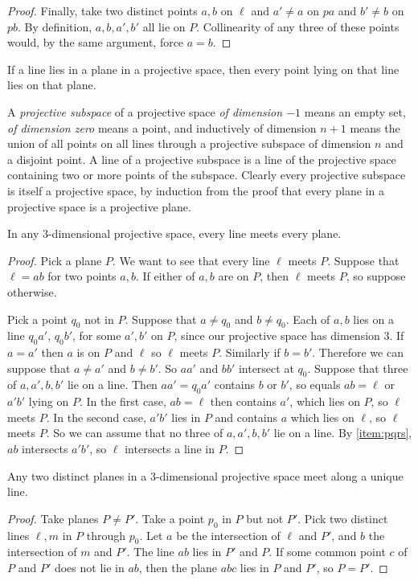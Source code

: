 \begin{proof}
Finally, take two distinct points \(a,b\) on \(\ell\) and \(a' \ne a\) on \(pa\) and \(b' \ne b\) on \(pb\).
By definition, \(a, b, a', b'\) all lie on \(P\).
Collinearity of any three of these points would, by the same argument, force \(a=b\).
\end{proof}
\begin{corollary}
If a line lies in a plane in a projective space, then every point lying on that line lies on that plane.
\end{corollary}
A \emph{projective subspace} of a projective space \emph{of dimension \(-1\)} means an empty set, \emph{of dimension zero} means a point, and inductively of dimension \(n+1\) means the union of all points on all lines through a projective subspace of dimension \(n\) and a disjoint point.
A line of a projective subspace is a line of the projective space containing two or more points of the subspace.
Clearly every projective subspace is itself a projective space, by induction from the proof that every plane in a projective space is a projective plane.
\begin{lemma}
In any \(3\)-dimensional projective space, every line meets every plane.
\end{lemma}
\begin{proof}
Pick a plane \(P\).
We want to see that every line \(\ell\) meets \(P\).
Suppose that \(\ell=ab\) for two points \(a, b\).
If either of \(a, b\) are on \(P\), then \(\ell\) meets \(P\), so suppose otherwise.

Pick a point \(q_0\) not in \(P\).
Suppose that \(a \ne q_0\) and \(b \ne q_0\).
Each of \(a, b\) lies on a line \(q_0 a'\), \(q_0 b'\), for some \(a', b'\) on \(P\), since our projective space has dimension 3.
If \(a=a'\) then \(a\) is on \(P\) and \(\ell\) so \(\ell\) meets \(P\).
Similarly if \(b=b'\).
Therefore we can suppose that \(a \ne a'\) and \(b \ne b'\).
So \(aa'\) and \(bb'\) intersect at \(q_0\).
Suppose that three of \(a, a', b, b'\) lie on a line. 
Then \(aa'=q_0 a'\) contains \(b\) or \(b'\), so equals \(ab=\ell\) or \(a'b'\) lying on \(P\).
In the first case, \(ab=\ell\) then contains \(a'\), which lies on \(P\), so \(\ell\) meets \(P\).
In the second case, \(a'b'\) lies in \(P\) and contains \(a\) which lies on \(\ell\), so \(\ell\) meets \(P\).
So we can assume that no three of \(a, a', b, b'\) lie on a line. 
By \ref{item:pqrs}, \(ab\) intersects \(a'b'\), so \(\ell\) intersects a line in \(P\).
\end{proof}
\begin{lemma}
Any two distinct planes in a \(3\)-dimensional projective space meet along a unique line.
\end{lemma}
\begin{proof}
Take planes \(P \ne P'\).
Take a point \(p_0\) in \(P\) but not \(P'\).
Pick two distinct lines \(\ell, m\) in \(P\) through \(p_0\).
Let \(a\) be the intersection of \(\ell\) and \(P'\), and \(b\) the intersection of \(m\) and \(P'\).
The line \(ab\) lies in \(P'\) and \(P\).
If some common point \(c\) of \(P\) and \(P'\) does not lie in \(ab\), then the plane \(abc\) lies in \(P\) and \(P'\), so \(P=P'\).
\end{proof}

